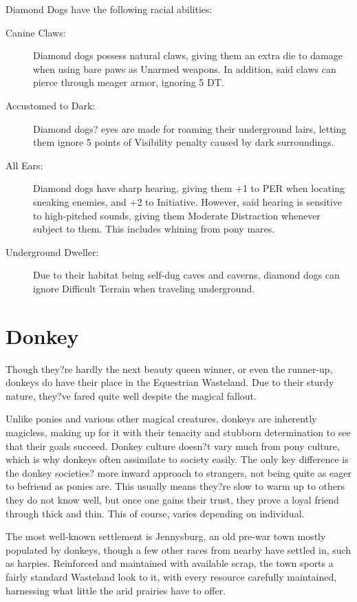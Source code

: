 \documentclass[11pt,a4paper,twocolumn]{book}
\begin{document}
	Diamond Dogs have the following racial abilities:
	\begin{description}
		\item[Canine Claws:] Diamond dogs possess natural claws, giving them an extra die to damage when using bare paws as Unarmed weapons. In addition, said claws can pierce through meager armor, ignoring 5 DT.
		\item[Accustomed to Dark:] Diamond dogs? eyes are made for roaming their underground lairs, letting them ignore 5 points of Visibility penalty caused by dark surroundings.
		\item[All Ears:] Diamond dogs have sharp hearing, giving them +1 to PER when locating sneaking enemies, and +2 to Initiative. However, said hearing is sensitive to high-pitched sounds, giving them Moderate Distraction whenever subject to them. This includes whining from pony mares.
		\item[Underground Dweller:] Due to their habitat being self-dug caves and caverns, diamond dogs can ignore Difficult Terrain when traveling underground.
	\end{description}

	\clearpage
	
	\section*{Donkey}
	
	Though they?re hardly the next beauty queen winner, or even the runner-up, donkeys do have their place in the Equestrian Wasteland. Due to their sturdy nature, they?ve fared quite well despite the magical fallout. 
	
	Unlike ponies and various other magical creatures, donkeys are inherently magicless, making up for it with their tenacity and stubborn determination to see that their goals succeed. Donkey culture doesn?t vary much from pony culture, which is why donkeys often assimilate to society easily. 
	The only key difference is the donkey societies? more inward approach to strangers, not being quite as eager to befriend as ponies are. This usually means they?re slow to warm up to others they do not know well, but once one gains their trust, they prove a loyal friend through thick and thin. This of course, varies depending on individual.
	
	The most well-known settlement is Jennysburg, an old pre-war town mostly populated by donkeys, though a few other races from nearby have settled in, such as harpies. Reinforced and maintained with available scrap, the town sports a fairly standard Wasteland look to it, with every resource carefully maintained, harnessing what little the arid prairies have to offer.
	
\end{document}

